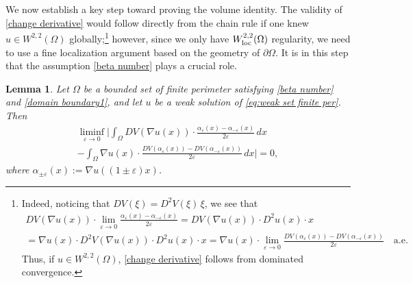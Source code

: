 \documentclass[reqno,11pt]{amsart}
\makeatletter
\newtheorem{lem}[thm]{Lemma}%
\numberwithin{equation}{section}
\theoremstyle{remark}
\makeatother
\begin{document}
We now establish a key step toward proving the volume identity. The validity of \eqref{change derivative} would follow directly from the chain rule
if one knew $u\in W^{2,2}(\Omega)$ globally;\footnote{Indeed, noticing that $DV(\xi)=D^2V(\xi)\,\xi$, we see that
\begin{multline*}
DV(\nabla u(x))\cdot\lim_{\varepsilon\to 0} \frac{\alpha_{\varepsilon}(x)-\alpha_{-\varepsilon}(x)}{2\varepsilon} = DV(\nabla u(x))\cdot D^2u(x)\cdot x \\
=\nabla u(x) \cdot D^2V(\nabla u(x))\cdot D^2u(x)\cdot x=\nabla u(x) \cdot \lim_{\varepsilon\to 0}\frac{DV(\alpha_{\varepsilon}(x))-DV(\alpha_{-\varepsilon}(x))}{2\varepsilon}\quad \text{a.e.}
\end{multline*}
Thus, if $u\in W^{2,2}(\Omega)$,
\eqref{change derivative} follows from dominated convergence.
} however, since we only have $W^{2,2}_{\rm loc}(\Omega)$ regularity, we need to use a fine localization argument
based on the geometry of $\partial\Omega$. It is in this step that the assumption \eqref{beta number} plays a crucial role.

\begin{lem}\label{second derivative}
Let $\Omega$ be a bounded set of finite perimeter satisfying \eqref{beta number} and \eqref{domain boundary1}, and let
$u$ be a weak solution of \eqref{eq:weak set finite per}. Then
\begin{multline}\label{change derivative}
\liminf_{\varepsilon\to 0}\bigg|
\int_{\Omega} DV(\nabla u(x))\cdot \frac{\alpha_{\varepsilon}(x)-\alpha_{-\varepsilon}(x)}{2\varepsilon}\,dx \\
-
\int_{\Omega} \nabla u(x)\cdot \frac{DV(\alpha_{\varepsilon}(x))-DV(\alpha_{-\varepsilon}(x))}{2\varepsilon}\,dx
\bigg|=0,
\end{multline}
where $\alpha_{\pm\varepsilon}(x):=\nabla u((1\pm\varepsilon)x)$.
\end{lem}
\end{document}
